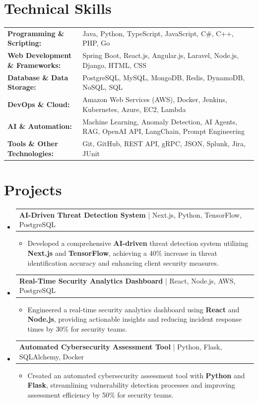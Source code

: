 \documentclass[letterpaper,10pt]{article}
\makeatletter
\newcommand{\resumeItem}[1]{
  \item{\fontsize{8pt}{9pt}\selectfont
    #1 \vspace{-3pt}
  }
}
\newcommand{\resumeProjectHeading}[2]{
    \item
    \begin{tabular*}{1.001\textwidth}{l@{\extracolsep{\fill}}r}
      \fontsize{8.5pt}{10pt}#1 & \textbf{\fontsize{8.5pt}{10pt} #2}\\
    \end{tabular*}\vspace{-7pt}
}
\newcommand{\resumeSubHeadingListStart}{\begin{itemize}[leftmargin=0pt, label={}]}
\newcommand{\resumeSubHeadingListEnd}{\end{itemize}}
\newcommand{\resumeItemListStart}{\begin{itemize}[leftmargin=*]}
\newcommand{\resumeItemListEnd}{\end{itemize}\vspace{-5pt}}
\makeatother
\begin{document}
\section{Technical Skills}
        \vspace{-14pt}
        \begin{table}[h]
            \fontsize{8pt}{9pt}\selectfont
            \begin{tabular}{p{0.3\linewidth} p{0.7\linewidth}}
                \textbf{Programming \& Scripting:} & Java, Python, TypeScript, JavaScript, C\#, C++, PHP, Go \\
                \textbf{Web Development \& Frameworks:} & Spring Boot, React.js, Angular.js, Laravel, Node.js, Django, HTML, CSS \\
                \textbf{Database \& Data Storage:} & PostgreSQL, MySQL, MongoDB, Redis, DynamoDB, NoSQL, SQL \\
                \textbf{DevOps \& Cloud:} & Amazon Web Services (AWS), Docker, Jenkins, Kubernetes, Azure, EC2, Lambda \\
                \textbf{AI \& Automation:} & Machine Learning, Anomaly Detection, AI Agents, RAG, OpenAI API, LangChain, Prompt Engineering \\
                \textbf{Tools \& Other Technologies:} & Git, GitHub, REST API, gRPC, JSON, Splunk, Jira, JUnit \\
            \end{tabular}
        \end{table}
 \vspace{-18pt}

\section{Projects}
    \vspace{-5pt}
    \resumeSubHeadingListStart
          \resumeProjectHeading
            {\textbf{AI-Driven Threat Detection System} | Next.js, Python, TensorFlow, PostgreSQL}{}
            \resumeItemListStart
                \resumeItem{Developed a comprehensive \textbf{AI-driven} threat detection system utilizing \textbf{Next.js} and \textbf{TensorFlow}, achieving a 40\% increase in threat identification accuracy and enhancing client security measures.}
            \resumeItemListEnd
        \vspace{-12pt}
    
        \resumeProjectHeading
            {\textbf{Real-Time Security Analytics Dashboard} | React, Node.js, AWS, PostgreSQL}{}
        \resumeItemListStart
                \resumeItem{Engineered a real-time security analytics dashboard using \textbf{React} and \textbf{Node.js}, providing actionable insights and reducing incident response times by 30\% for security teams.}
        \resumeItemListEnd
      \vspace{-12pt}
      \resumeProjectHeading
        {\textbf{Automated Cybersecurity Assessment Tool} | Python, Flask, SQLAlchemy, Docker}{}
    \resumeItemListStart
            \resumeItem{Created an automated cybersecurity assessment tool with \textbf{Python} and \textbf{Flask}, streamlining vulnerability detection processes and improving assessment efficiency by 50\% for security teams.}
    \resumeItemListEnd
    \resumeSubHeadingListEnd
\end{document}
